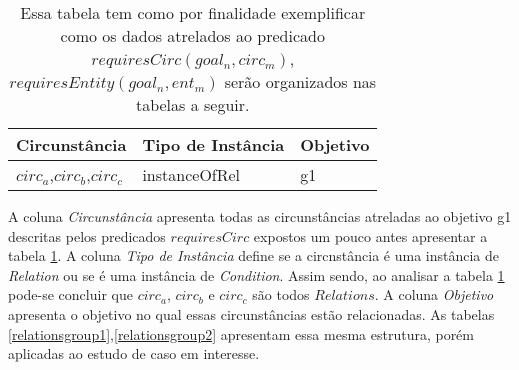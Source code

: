 \begin{table}[H]
\centering
{}
\begin{tabular}{|l|l|l|}
\hline
\textbf{Circunstância}		 	& \textbf{Tipo de Instância}	&	\textbf{Objetivo}	\\ \hline
$circ_a$,$circ_b$,$circ_c$		& instanceOfRel 				& 	 g1         		\\ \hline
\end{tabular}
\caption{Essa tabela tem como por finalidade exemplificar como os dados atrelados ao predicado $requiresCirc(goal_n, circ_m)$,$requiresEntity(goal_n, ent_m)$ serão organizados nas tabelas a seguir.}
\label{tableexemplgroupdataone}
\end{table}

A coluna \textit{Circunstância} apresenta todas as circunstâncias atreladas ao objetivo g1 descritas pelos predicados $requiresCirc$ expostos um pouco antes apresentar a tabela \ref{tableexemplgroupdataone}. A coluna \textit{Tipo de Instância} define se a circnstância é uma instância de \textit{Relation} ou se é uma instância de \textit{Condition}. Assim sendo, ao analisar a tabela \ref{tableexemplgroupdataone} pode-se concluir que $circ_a$, $circ_b$ e $circ_c$ são todos $Relations$. A coluna \textit{Objetivo} apresenta o objetivo no qual essas circunstâncias estão relacionadas. As tabelas \ref{relationsgroup1},\ref{relationsgroup2} apresentam essa mesma estrutura, porém aplicadas ao estudo de caso em interesse.

